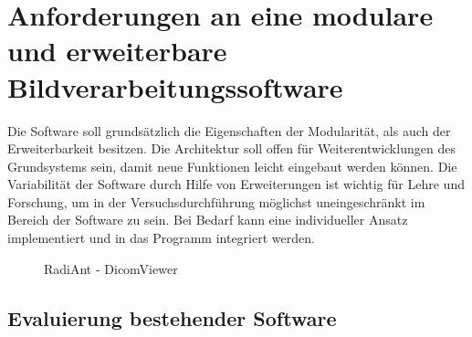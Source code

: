 \chapter{Anforderungen an eine modulare und erweiterbare Bildverarbeitungssoftware}\label{anforderungen}


Die Software soll grundsätzlich die Eigenschaften der Modularität, als auch der Erweiterbarkeit besitzen. Die Architektur soll offen für Weiterentwicklungen des Grundsystems sein, damit neue Funktionen leicht eingebaut werden können. Die Variabilität der Software durch Hilfe von Erweiterungen ist wichtig für Lehre und Forschung, um in der Versuchsdurchführung möglichst uneingeschränkt im Bereich der Software zu sein. Bei Bedarf kann eine individueller Ansatz implementiert und in das Programm integriert werden.\\
       
\begin{figure}[htbp]
  \vspace{0.5cm}
  \centering
   \caption{RadiAnt - DicomViewer}
  \label{radiant}
  \vspace{0.5cm}
\end{figure}



\section{Evaluierung bestehender Software}


